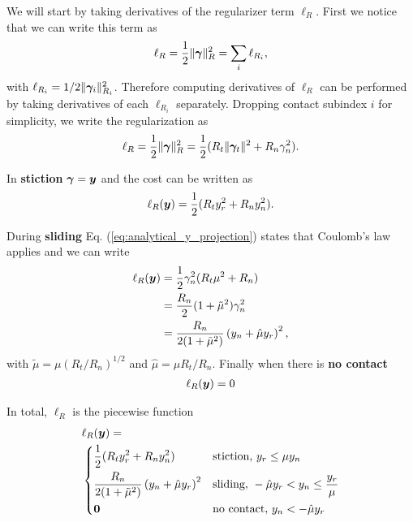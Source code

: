 We will start by taking derivatives of the regularizer term $\ell_R$. First we
notice that we can write this term as
\begin{equation*}
	\ell_R = \frac{1}{2}\Vert{\bm\gamma}\Vert_{R}^2 = 
	\sum_i \ell_{R_i},
\end{equation*}
with $\ell_{R_i}=1/2\Vert{\bm\gamma}_i\Vert_{R_i}^2$. Therefore computing
derivatives of $\ell_R$ can be performed by taking derivatives of each
$\ell_{R_i}$ separately. Dropping contact subindex $i$ for simplicity, we write the regularization as
\begin{eqnarray*}
	\ell_R = \frac{1}{2}\Vert{\bm\gamma}\Vert_R^2=\frac{1}{2}(R_t\Vert{\bm\gamma}_t\Vert^2+R_n\gamma_n^2).
\end{eqnarray*}

In \textbf{stiction} ${\bm\gamma}={\bm{y}}$ and the cost can be written as
\begin{eqnarray*}
	\ell_R({\bm{y}}) = \frac{1}{2}(R_t y_r^2+R_n y_n^2).
\end{eqnarray*}

During \textbf{sliding} Eq. (\ref{eq:analytical_y_projection}) states that Coulomb's law applies and we can write
\begin{align*}
	\ell_R({\bm{y}})
	&=\frac{1}{2}\gamma_n^2(R_t\mu^2+R_n)\\
	&=\frac{R_n}{2}(1+\tilde\mu^2)\gamma_n^2\\
	&=\frac{R_n}{2(1+\tilde\mu^2)}\left(y_n + \hat\mu y_r\right)^2,
\end{align*}
with $\tilde{\mu}=\mu (R_t/R_n)^{1/2}$ and $\hat{\mu}=\mu R_t/R_n$. Finally when there is \textbf{no contact}
\begin{eqnarray*}
	\ell_R({\bm{y}}) = 0
\end{eqnarray*}

In total, $\ell_R$ is the piecewise function
\begin{align}
	&\ell_R(\vf{y}) = 
	\label{eq:ell_R_piecewise}\\	
&\begin{dcases}
	\frac{1}{2}(R_t y_r^2+R_n y_n^2) & \text{stiction, } y_r \le \mu y_n\\
	\frac{R_n}{2(1+\tilde\mu^2)}\left(y_n + \hat\mu y_r\right)^2 & \text{sliding, } -\hat\mu y_r < y_n \leq \frac{y_r}{\mu}\\
    \vf{0} & \text{no contact, } y_n < -\hat\mu y_r
\end{dcases}\nonumber	
\end{align}

